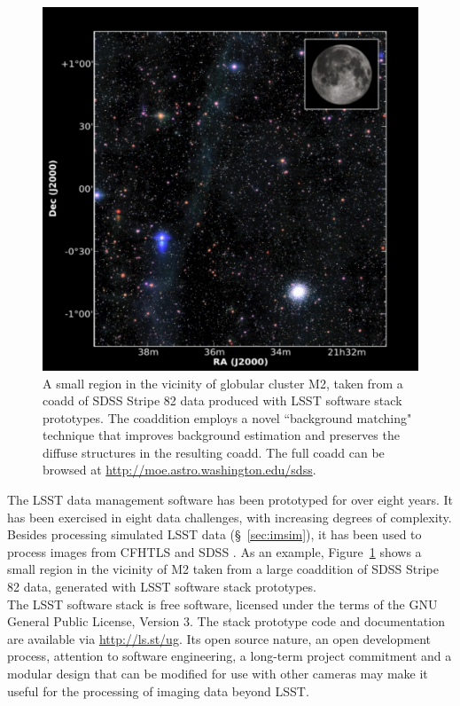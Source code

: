 \documentclass[11pt,twoside]{article}
\begin{document}
\begin{figure}
%
%
\includegraphics[width=1.0\hsize,clip]{DMStripe82.pdf}
\caption{
A small region in the vicinity of globular cluster M2, taken from a coadd of
SDSS Stripe 82 data produced with LSST software stack prototypes.  The
coaddition employs a novel ``background matching" technique that improves
background estimation and preserves the diffuse structures in the resulting
coadd.  The full coadd can be browsed at \url{http://moe.astro.washington.edu/sdss}.}
\label{Fig:DMStripe82}
\end{figure}


The LSST data management software has been prototyped for over eight
years. It has been exercised in eight data challenges, with increasing
degrees of complexity. Besides processing simulated LSST data
(\S~\ref{sec:imsim}), it has been used to process images from CFHTLS
and SDSS \citep{DR7}. As an example,
Figure~\ref{Fig:DMStripe82} shows a small region in the vicinity of M2
taken from a large coaddition of SDSS Stripe 82 data, generated with LSST
software stack prototypes. 
\\

The LSST software stack is free software, licensed under the terms of the GNU General
Public License, Version 3. The stack
prototype code and documentation are available via \url{http://ls.st/ug}.
Its open source nature, an open development
process, attention to software engineering, a long-term project
commitment and a modular design that can be modified for use with
other cameras 
may make it useful for the processing of imaging data beyond LSST.  
\end{document}
